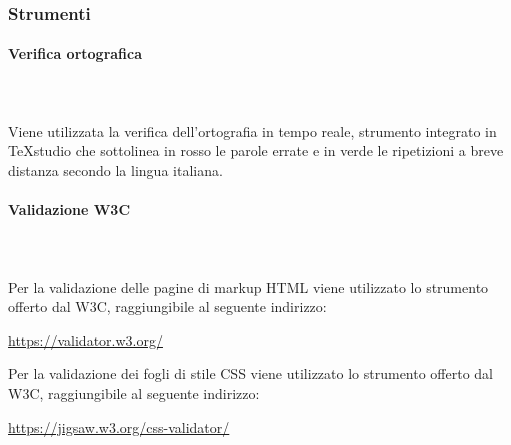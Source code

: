 		
			
	\subsubsection{Strumenti}
		\paragraph{Verifica ortografica} \mbox{}\\ \mbox{}\\
		Viene utilizzata la verifica dell'ortografia in tempo reale, strumento integrato in \TeX{}studio che sottolinea in rosso le parole errate e in verde le ripetizioni a breve distanza secondo la lingua italiana.
		\paragraph{Validazione W3C} \mbox{}\\ \mbox{}\\
		Per la validazione delle pagine di markup HTML viene utilizzato lo strumento offerto dal W3C, raggiungibile al seguente indirizzo: \newline
		\centerline{\url{https://validator.w3.org/}} \newline \newline
		Per la validazione dei fogli di stile CSS viene utilizzato lo strumento offerto dal W3C, raggiungibile al seguente indirizzo: \newline
		\centerline{\url{https://jigsaw.w3.org/css-validator/}} \newline


